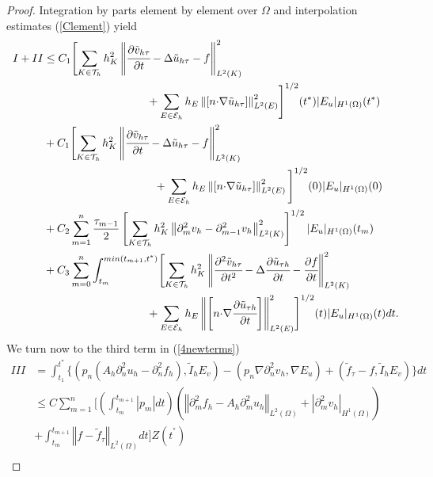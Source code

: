 \documentclass{imanum}
\begin{document}
\begin{proof}
  Integration by parts element by element over $\Omega$ and interpolation estimates (\ref{Clement}) yield
\begin{align*}
  I+II
  &\leq C_{1}\Biggl[\sum_{K{\in}\mathcal{T}_h}h_{K}^{2}\left\Vert\cfrac{{\partial}\tilde{v}_{h{\tau}}}{\partial t}-{\Delta}\tilde{u}_{h{\tau}}-f\right\Vert_{L^2( K)}^{2}\\
 &~~~~~~~~~~~~~~~~~~~~~~~~~~~~+\sum_{
E \in \mathcal{E}_h}h_{E}\left\|[n{\cdot}{\nabla}\tilde{u}_{h{\tau}}]\right\|_{L^2(E)}^{2}\Biggr]^{1/2}(t^{{\ast}})|E_{u}|_{H^1(\Omega)}(t^{{\ast}}) \\
  &+C_{1}\Biggl[\sum_{K{\in}\mathcal{T}_h}h_{K}^{2}\left\Vert\cfrac{{\partial}\tilde{v}_{h{\tau}}}{\partial t}-{\Delta}\tilde{u}_{h{\tau}}-f\right\Vert_{L^2(K)}^{2}\\
  &~~~~~~~~~~~~~~~~~~~~~~~~~~~~~~+\sum_{
E \in \mathcal{E}_h}h_{E}\left\|[n{\cdot}{\nabla}\tilde{u}_{h{\tau}}]\right\|_{L^2(E)}^{2}\Biggl]^{1/2}(0)|E_{u}|_{H^1(\Omega)}(0)\\
  &
  +C_{2}\sum_{m=1}^{n}\frac{{\tau}_{m-1}}{2}\left[\sum_{K{\in}\mathcal{T}_h}h_{K}^{2}\left\|{\partial}_{m}^{2}v_{h}-{\partial}_{m-1}^{2}v_{h}\right\|_{L^2( K)}^{2}\right]^{1/2}|E_{u}|_{H^1(\Omega)}(t_{m})\\
  &
  +C_{3}\sum_{m=0}^{n}\int_{t_{m}}^{min(t_{m+1},t^{{\ast}})}\Biggl[\sum_{K{\in}\mathcal{T}_h}h_{K}^{2}\left\Vert\cfrac{{\partial}^{2}\tilde{v}_{h{\tau}}}{\partial t^2}-{\Delta}\cfrac{{\partial}\tilde{u}_{{\tau}h}}{\partial t}-\cfrac{\partial f}{\partial t}\right\Vert_{L^2(K)}^{2}\\
  &~~~~~~~~~~~~~~~~~~~~~~~~~~~~+\sum_{
E \in \mathcal{E}_h}h_{E}\left\Vert\left[n{\cdot}{\nabla}\cfrac{{\partial}\tilde{u}_{{\tau}h}}{\partial t}\right]\right\Vert_{L^2(E)}^{2}\Biggr]^{1/2 }(t)|E_{u}|_{H^1(\Omega)}(t)dt.
\end{align*}
We turn now to the third term in (\ref{4newterms})
\begin{align*}
 I I I &= \int_{t_1}^{t^{\ast}} \{(p_n (A_h {\partial}_{n}^{2} u_{h}-{\partial}_{n}^{2}f_h),\tilde I_{h} E_{v})-\left(p_n {\nabla}{\partial}_{n}^{2} v_{h},{\nabla}E_{u}\right)
  +(\tilde{f}_\tau-f,\tilde I_{h} E_{v}) \}dt \\
   & \leq C
   \sum_{m = 1}^n \Biggl[ \left( \int_{t_m}^{t^{}_{m + 1}} |p_m|{dt} \right) 
   \left( \left\Vert \partial_m^2 f_h - A_h \partial_m^2 u_h \right\Vert_{L^2(\Omega)} + \left\vert \partial_m^2 v_h\right\vert_{H^1(\Omega)}\right)\\
  &+\int_{t_m}^{t^{}_{m + 1}} \left\Vert f-\tilde{f}_\tau \right\Vert_{L^2(\Omega)} {dt} \Biggr] Z ( t^{^{\ast}}) \\

\end{align*}
\end{proof}
\end{document}
